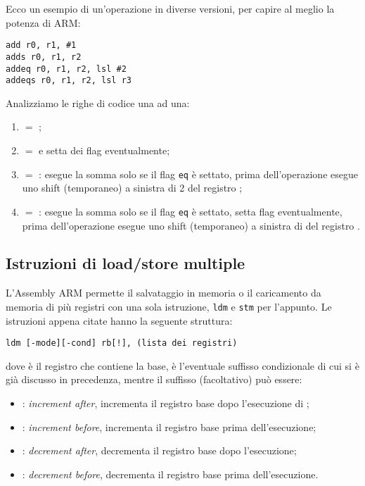 \documentclass[class=book, crop=false, oneside]{standalone}
\begin{document}
Ecco un esempio di un'operazione in diverse versioni, per capire al meglio la potenza di ARM:
\begin{verbatim}
add r0, r1, #1
adds r0, r1, r2
addeq r0, r1, r2, lsl #2
addeqs r0, r1, r2, lsl r3
\end{verbatim}
Analizziamo le righe di codice una ad una:
\begin{enumerate}
	\item {} \(=\) ;
	\item {} \(=\)  e setta dei flag eventualmente;
	\item {} \(=\) : esegue la somma solo se il flag \texttt{eq} è settato, prima dell'operazione esegue uno shift (temporaneo) a sinistra di 2 del registro ;
	\item {} \(=\) : esegue la somma solo se il flag \texttt{eq} è settato, setta flag eventualmente, prima dell'operazione esegue uno shift (temporaneo) a sinistra di  del registro .
\end{enumerate}

\subsection*{Istruzioni di load/store multiple}
L'Assembly ARM permette il salvataggio in memoria o il caricamento da memoria di più registri con una sola istruzione, \texttt{ldm} e \texttt{stm} per l'appunto. Le istruzioni appena citate hanno la seguente struttura:
\begin{center}
	\texttt{ldm [-mode][-cond] rb[!], (lista dei registri)}
\end{center}
dove  è il registro che contiene la base,  è l'eventuale suffisso condizionale di cui si è già discusso in precedenza, mentre il suffisso (facoltativo)  può essere:
\begin{itemize}
	\item {}: \emph{increment after}, incrementa il registro base dopo l'esecuzione di ;
	\item {}: \emph{increment before}, incrementa il registro base prima dell'esecuzione;
	\item {}: \emph{decrement after}, decrementa il registro base dopo l'esecuzione;
	\item {}: \emph{decrement before}, decrementa il registro base prima dell'esecuzione.
\end{itemize}
\end{document}
